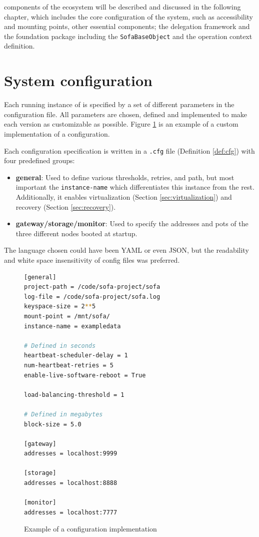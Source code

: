  components of the \CodeName ecosystem will be described and discussed in the following chapter, which includes the core configuration of the system, such as accessibility and mounting points, other essential components; the delegation framework and the foundation package including the \texttt{SofaBaseObject} and the operation context definition.

\section{System configuration} \label{sec:configuration}
Each running instance of \CodeName is specified by a set of different parameters in the configuration file. All parameters are chosen, defined and implemented to make each version as customizable as possible. Figure \ref{fig:cfg_example} is an example of a custom implementation of a \CodeName configuration.
\newline

Each configuration specification is written in a \texttt{.cfg} file (Definition \ref{def:cfg}) with four predefined groups:
\begin{itemize}
	\item \textbf{general}: Used to define various thresholds, retries, and path, but most important the \texttt{instance-name} which differentiates this instance from the rest. Additionally, it enables virtualization (Section \ref{sec:virtualization}) and recovery (Section \ref{sec:recovery}).
	\item \textbf{gateway/storage/monitor}: Used to specify the addresses and pots of the three different nodes booted at startup.
\end{itemize}

The language chosen could have been YAML \cite{PageYaml} or even JSON, but the readability and white space insensitivity of config files was preferred.

\begin{figure}
\vspace*{4mm}
\begin{lstlisting}[language=bash, frame=single, basicstyle=\ttfamily\tiny, otherkeywords={[,],=}, numbers=none, deletekeywords=enable]
[general]
project-path = /code/sofa-project/sofa
log-file = /code/sofa-project/sofa.log
keyspace-size = 2**5
mount-point = /mnt/sofa/
instance-name = exampledata

# Defined in seconds
heartbeat-scheduler-delay = 1
num-heartbeat-retries = 5
enable-live-software-reboot = True

load-balancing-threshold = 1

# Defined in megabytes
block-size = 5.0

[gateway]
addresses = localhost:9999

[storage]
addresses = localhost:8888

[monitor]
addresses = localhost:7777
\end{lstlisting}

\caption{Example of a \CodeName configuration implementation \label{fig:cfg_example}}
\end{figure}

